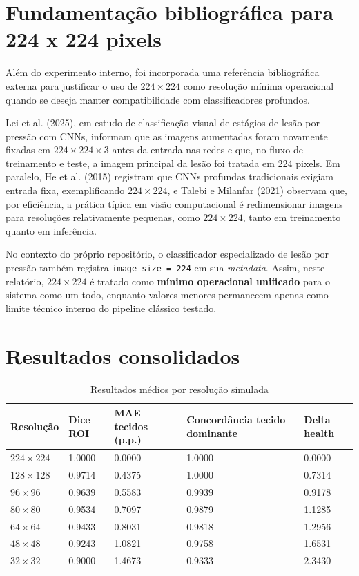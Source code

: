 \documentclass[
    12pt,
    openright,
    oneside,
    a4paper,
    chapter=TITLE,
    section=TITLE,
    brazil,
    sumario=tradicional,
    hidelinks
]{abntex2}
\begin{document}
\section{Fundamentação bibliográfica para 224 x 224 pixels}
Além do experimento interno, foi incorporada uma referência bibliográfica externa para justificar o uso de \(224 \times 224\) como resolução mínima operacional quando se deseja manter compatibilidade com classificadores profundos.

Lei et al. (2025), em estudo de classificação visual de estágios de lesão por pressão com CNNs, informam que as imagens aumentadas foram novamente fixadas em \(224 \times 224 \times 3\) antes da entrada nas redes e que, no fluxo de treinamento e teste, a imagem principal da lesão foi tratada em 224 pixels. Em paralelo, He et al. (2015) registram que CNNs profundas tradicionais exigiam entrada fixa, exemplificando \(224 \times 224\), e Talebi e Milanfar (2021) observam que, por eficiência, a prática típica em visão computacional é redimensionar imagens para resoluções relativamente pequenas, como \(224 \times 224\), tanto em treinamento quanto em inferência.

No contexto do próprio repositório, o classificador especializado de lesão por pressão também registra \texttt{image\_size = 224} em sua \textit{metadata}. Assim, neste relatório, \(224 \times 224\) é tratado como \textbf{mínimo operacional unificado} para o sistema como um todo, enquanto valores menores permanecem apenas como limite técnico interno do pipeline clássico testado.

\section{Resultados consolidados}
\begin{table}[h]
\centering
\caption{Resultados médios por resolução simulada}
\begin{tabular}{L{2.1cm}L{2.4cm}L{2.9cm}L{3.1cm}L{2.7cm}}
\toprule
\textbf{Resolução} & \textbf{Dice ROI} & \textbf{MAE tecidos (p.p.)} & \textbf{Concordância tecido dominante} & \textbf{Delta health} \\
\midrule
\(224 \times 224\) & 1.0000 & 0.0000 & 1.0000 & 0.0000 \\
\(128 \times 128\) & 0.9714 & 0.4375 & 1.0000 & 0.7314 \\
\(96 \times 96\) & 0.9639 & 0.5583 & 0.9939 & 0.9178 \\
\(80 \times 80\) & 0.9534 & 0.7097 & 0.9879 & 1.1285 \\
\(64 \times 64\) & 0.9433 & 0.8031 & 0.9818 & 1.2956 \\
\(48 \times 48\) & 0.9243 & 1.0821 & 0.9758 & 1.6531 \\
\(32 \times 32\) & 0.9000 & 1.4673 & 0.9333 & 2.3430 \\
\bottomrule
\end{tabular}
\end{table}
\end{document}

